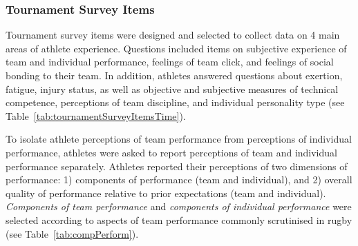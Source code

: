 \begin{CJK}{UTF8}{gbsn}



\subsubsection{Tournament Survey Items\label{survey:Tournament Survey Items}}

Tournament survey items were designed and selected to collect data on 4 main areas of athlete experience.  Questions included items on subjective experience of team and individual performance, feelings of team click, and feelings of social bonding to their team.  In addition, athletes answered questions about exertion, fatigue, injury status, as well as objective and subjective measures of technical competence, perceptions of team discipline, and individual personality type (see Table~\ref{tab:tournamentSurveyItemsTime}).






To isolate athlete perceptions of team performance from perceptions of individual performance, athletes were asked to report perceptions of team and individual performance separately.  Athletes reported their perceptions of two dimensions of performance: 1) components of performance (team and individual), and 2) overall quality of performance relative to prior expectations (team and individual).  \textit{Components of team performance} and \textit{components of individual performance} were selected according to aspects of team performance commonly scrutinised in rugby (see Table~\ref{tab:compPerform}).


\end{CJK}
